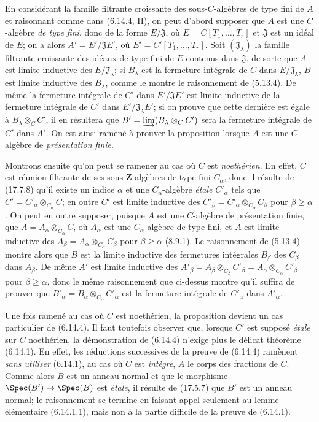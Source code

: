 En considérant la famille filtrante croissante des sous-$C$-algèbres de type fini de $A$ et raisonnant comme dans (6.14.4, II), on peut d'abord supposer que $A$ est une $C$-algèbre \emph{de type fini}, donc de la forme $E/\mathfrak J$, où $E=C[T_1,\ldots,T_r]$ et $\mathfrak J$ est un idéal de $E$; on a alors $A'=E'/\mathfrak JE'$, où $E'=C'[T_1,\ldots,T_r]$. Soit $(\mathfrak J_\lambda)$ la famille filtrante croissante des idéaux de type fini de $E$ contenus dans $\mathfrak J$, de sorte que $A$ est limite inductive des $E/\mathfrak J_\lambda$; si $B_\lambda$ est la fermeture intégrale de $C$ dans $E/\mathfrak J_\lambda$, $B$ est limite inductive des $B_\lambda$, comme le montre le raisonnement de (5.13.4). De même la fermeture intégrale de $C'$ dans $E'/\mathfrak JE'$ est limite inductive de la fermeture intégrale de $C'$ dans $E'/\mathfrak J_\lambda E'$; si on prouve que cette dernière est égale à $B_\lambda\otimes_C C'$, il en résultera que $B'=\varinjlim(B_\lambda\otimes_C C')$ sera la fermeture intégrale de $C'$ dans $A'$. On est ainsi ramené à prouver la proposition lorsque $A$ est une $C$-algèbre de \emph{présentation finie}.

Montrons ensuite qu'on peut se ramener au cas où $C$ est \emph{noethérien}. En effet, $C$ est réunion filtrante de ses sous-$\mathbf Z$-algèbres de type fini $C_\alpha$, donc il résulte de (17.7.8) qu'il existe un indice $\alpha$ et une $C_\alpha$-algèbre \emph{étale} $C'_\alpha$ tels que $C'=C'_\alpha\otimes_{C_\alpha}C$; en outre $C'$ est limite inductive des $C'_\beta=C'_\alpha\otimes_{C_\alpha}C_\beta$ pour $\beta\geq\alpha$. On peut en outre supposer, puisque $A$ est une $C$-algèbre de présentation finie, que $A=A_\alpha\otimes_{C_\alpha}C$, où $A_\alpha$ est une $C_\alpha$-algèbre de type fini, et $A$ est limite inductive des $A_\beta=A_\alpha\otimes_{C_\alpha}C_\beta$ pour $\beta\geq\alpha$ (8.9.1). Le raisonnement de (5.13.4) montre alors que $B$ est la limite inductive des fermetures intégrales $B_\beta$ des $C_\beta$ dans $A_\beta$. De même $A'$ est limite inductive des $A'_\beta=A_\beta\otimes_{C_\beta}C'_\beta=A_\alpha\otimes_{C_\alpha}C'_\beta$ pour $\beta\geq\alpha$, donc le même raisonnement que ci-dessus montre qu'il suffira de prouver que $B'_\alpha=B_\alpha\otimes_{C_\alpha}C'_\alpha$ est la fermeture intégrale de $C'_\alpha$ dans $A'_\alpha$.

Une fois ramené au cas où $C$ est noethérien, la proposition devient un cas particulier de (6.14.4). Il faut toutefois observer que, lorsque $C'$ est supposé \emph{étale} sur $C$ noethérien, la démonstration de (6.14.4) n'exige plus le délicat théorème (6.14.1). En effet, les réductions successives de la preuve de (6.14.4) ramènent \emph{sans utiliser} (6.14.1), au cas où $C$ est \emph{intègre}, $A$ le corps des fractions de $C$. Comme alors $B$ est un anneau normal et que le morphisme $\Spec(B')\to\Spec(B)$ est \emph{étale}, il résulte de (17.5.7) que $B'$ est un anneau normal; le raisonnement se termine en faisant appel seulement au lemme élémentaire (6.14.1.1), mais non à la partie difficile de la preuve de (6.14.1).

